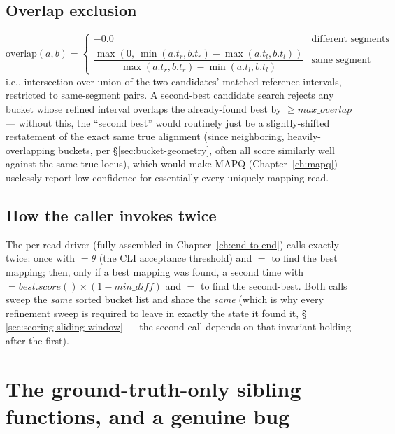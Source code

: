 \subsection{Overlap exclusion}
\label{sec:overlap-exclusion}

\[
  \mathrm{overlap}(a, b) = \begin{cases} -0.0 & \text{different segments} \\
  \dfrac{\max(0,\ \min(a.t_r,b.t_r) - \max(a.t_l,b.t_l))}{\max(a.t_r,b.t_r) - \min(a.t_l,b.t_l)}
  & \text{same segment} \end{cases}
\]
i.e., intersection-over-union of the two candidates' matched reference intervals, restricted to
same-segment pairs. A second-best candidate search rejects any bucket whose refined interval
overlaps the already-found best by $\ge \mathit{max\_overlap}$ --- without this, the ``second
best'' would routinely just be a slightly-shifted restatement of the exact same true alignment
(since neighboring, heavily-overlapping buckets, per \S\ref{sec:bucket-geometry}, often all score
similarly well against the same true locus), which would make MAPQ (Chapter~\ref{ch:mapq})
uselessly report low confidence for essentially every uniquely-mapping read.

\subsection{How the caller invokes  twice}

The per-read driver (fully assembled in Chapter~\ref{ch:end-to-end}) calls 
exactly twice: once with $=\theta$ (the CLI acceptance threshold) and
$=$ to find the best mapping; then, only if a best mapping was found,
a second time with  $= \mathit{best.score()} \times (1 - \mathit{min\_diff})$ and
$=$ to find the second-best. Both calls sweep the \emph{same} sorted
bucket list and share the \emph{same}  (which is why every refinement sweep is
required to leave  in exactly the state it found it, \S
\ref{sec:scoring-sliding-window} --- the second call depends on that invariant holding after the
first).

\section{The ground-truth-only sibling functions, and a genuine bug}
\label{sec:matcher-best-fixed-length}

